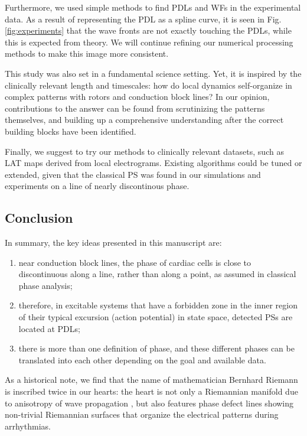 \documentclass[aps,pre,amsfonts,amssymb,amsmath,twocolumn, superscriptaddress]{revtex4-1}
\begin{document}
Furthermore, we used simple methods to find PDLs and WFs in the experimental data. As a result of representing the PDL as a spline curve, it is seen in Fig. \ref{fig:experiments} that the wave fronts are not exactly touching the PDLs, while this is expected from theory. We will continue refining our numerical processing methods to make this image more consistent. 

This study was also set in a fundamental science setting. Yet, it is inspired by the clinically relevant length and timescales: how do local dynamics self-organize in complex patterns with rotors and conduction block lines? In our opinion, contributions to the answer can be found from scrutinizing the patterns themselves, and building up a comprehensive understanding after the correct building blocks have been identified. 

Finally, we suggest to try our methods to clinically relevant datasets, such as LAT maps derived from local electrograms. Existing algorithms could be tuned or extended, given that the classical PS was found in our simulations and experiments on a line of nearly discontinous phase. 

\subsection{Conclusion}
In summary, the key ideas presented in this manuscript are:
\begin{enumerate}
\item near conduction block lines, the phase of cardiac cells is close to discontinuous along a line, rather than along a point, as assumed in classical phase analysis; 
\item therefore, in excitable systems that have a forbidden zone in the inner region of their typical excursion (action potential) in state space, detected PSs are located at PDLs;
    \item there is more than one definition of phase, and these different phases can be translated into each other depending on the goal and available data. 
\end{enumerate}

As a historical note, we find that the name of mathematician Bernhard Riemann is inscribed twice in our hearts: the heart is not only a Riemannian manifold due to anisotropy of wave propagation \citep{Wellner:2002,Verschelde:2007,Young:2010}, but also features phase defect lines showing non-trivial Riemannian surfaces that organize the electrical patterns during arrhythmias.
\end{document}

